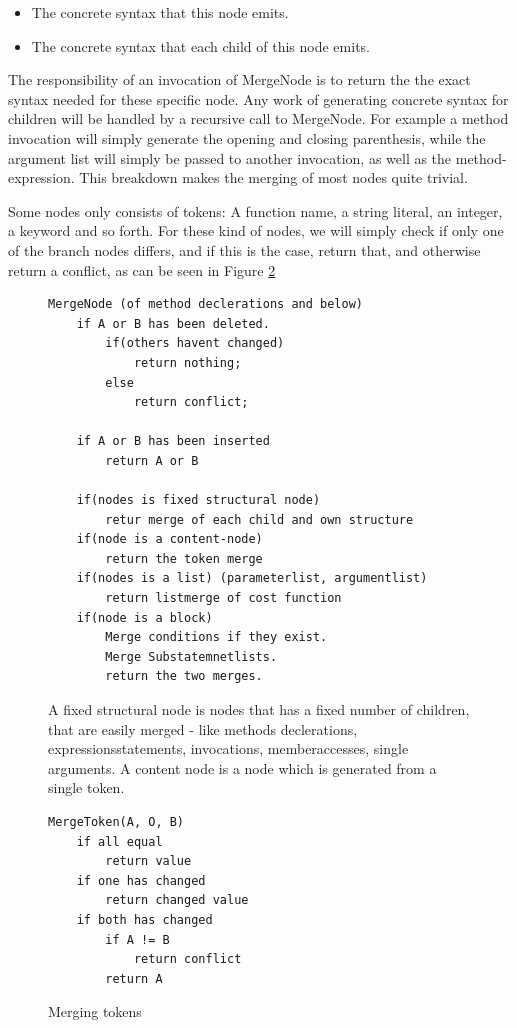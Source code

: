 \documentclass[11pt]{article}
\begin{document}
\begin{itemize}
   \item The concrete syntax that this node emits.
   \item The concrete syntax that each child of this node emits.
\end{itemize}

The responsibility of an invocation of MergeNode is to return the the exact syntax needed for these specific node. Any work of generating concrete syntax for children will be handled by a recursive call to MergeNode. For example a method invocation will simply generate the opening and closing parenthesis, while the argument list will simply be passed to another invocation, as well as the method-expression. This breakdown makes the merging of most nodes quite trivial.

Some nodes only consists of tokens: A function name, a string literal, an integer, a keyword and so forth. For these kind of nodes, we will simply check if only one of the branch nodes differs, and if this is the case, return that, and otherwise return a conflict, as can be seen in Figure \ref{MergeToken}


\begin{figure}
\begin{verbatim}
MergeNode (of method declerations and below)
    if A or B has been deleted.
        if(others havent changed)
            return nothing;
        else
            return conflict;
            
    if A or B has been inserted
        return A or B
        
    if(nodes is fixed structural node)
        retur merge of each child and own structure
    if(node is a content-node) 
        return the token merge
    if(nodes is a list) (parameterlist, argumentlist)
        return listmerge of cost function
    if(node is a block)
        Merge conditions if they exist.
        Merge Substatemnetlists.
        return the two merges.

\end{verbatim}
\caption{A fixed structural node is nodes that has a fixed number of children, that are easily merged - like methods declerations, expressionsstatements, invocations, memberaccesses, single arguments. A content node is a node which is generated from a single token.}
  \label{MergeNode}
\end{figure}


\begin{figure}
\begin{verbatim}
MergeToken(A, O, B)
    if all equal
        return value
    if one has changed
        return changed value
    if both has changed 
        if A != B
            return conflict
        return A
\end{verbatim}
  \caption{Merging tokens}
  \label{MergeToken}
\end{figure}
\end{document}
